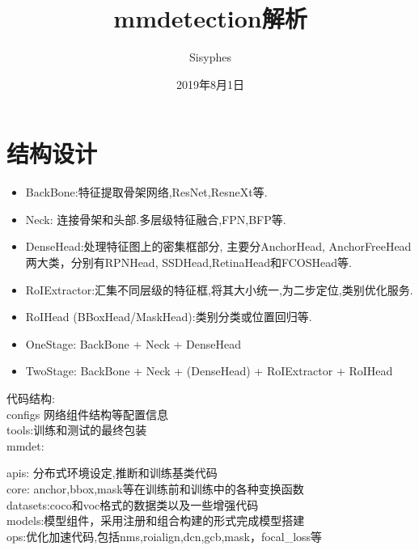 \documentclass[UTF8]{ctexart}
\title{mmdetection解析}
\author{Sisyphes}
\date{2019年8月1日}
\begin{document}
\maketitle
\tableofcontents
\newpage

% 
% 
\section{结构设计}
\begin{itemize}
	\item BackBone:特征提取骨架网络,ResNet,ResneXt等.
	\item Neck: 连接骨架和头部.多层级特征融合,FPN,BFP等.
	\item DenseHead:处理特征图上的密集框部分, 主要分AnchorHead, AnchorFreeHead两大类，分别有RPNHead, SSDHead,RetinaHead和FCOSHead等.
	\item RoIExtractor:汇集不同层级的特征框,将其大小统一,为二步定位,类别优化服务.
	\item RoIHead (BBoxHead/MaskHead):类别分类或位置回归等.
	\item OneStage: BackBone + Neck + DenseHead
	\item TwoStage: BackBone + Neck  + (DenseHead) + RoIExtractor + RoIHead
	
\end{itemize}


\noindent 代码结构:\\
configs 网络组件结构等配置信息\\
tools:训练和测试的最终包装\\
mmdet:
\begin{adjustwidth}{0.5cm}{0cm}
	apis: 分布式环境设定,推断和训练基类代码\\
	core: anchor,bbox,mask等在训练前和训练中的各种变换函数\\
	datasets:coco和voc格式的数据类以及一些增强代码\\
	models:模型组件，采用注册和组合构建的形式完成模型搭建\\
	ops:优化加速代码,包括nms,roialign,dcn,gcb,mask，focal\_loss等\\
\end{adjustwidth}
\end{document}
